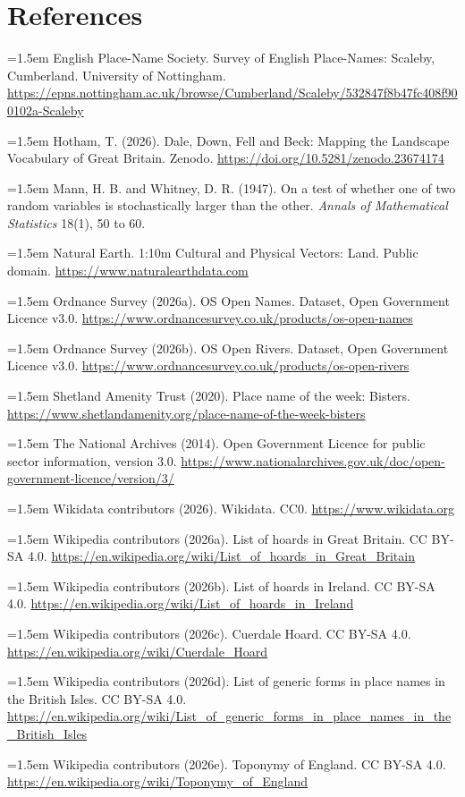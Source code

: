 \documentclass[11pt,a4paper]{article}
\begin{document}
\section*{References}
\small
\setlength{\parskip}{0.35em}
\hangindent=1.5em English Place-Name Society. Survey of English Place-Names: Scaleby, Cumberland. University of Nottingham. \url{https://epns.nottingham.ac.uk/browse/Cumberland/Scaleby/532847f8b47fc408f900102a-Scaleby}

\hangindent=1.5em Hotham, T. (2026). Dale, Down, Fell and Beck: Mapping the Landscape Vocabulary of Great Britain. Zenodo. \url{https://doi.org/10.5281/zenodo.23674174}

\hangindent=1.5em Mann, H. B. and Whitney, D. R. (1947). On a test of whether one of two random variables is stochastically larger than the other. \textit{Annals of Mathematical Statistics} 18(1), 50 to 60.

\hangindent=1.5em Natural Earth. 1:10m Cultural and Physical Vectors: Land. Public domain. \url{https://www.naturalearthdata.com}

\hangindent=1.5em Ordnance Survey (2026a). OS Open Names. Dataset, Open Government Licence v3.0. \url{https://www.ordnancesurvey.co.uk/products/os-open-names}

\hangindent=1.5em Ordnance Survey (2026b). OS Open Rivers. Dataset, Open Government Licence v3.0. \url{https://www.ordnancesurvey.co.uk/products/os-open-rivers}

\hangindent=1.5em Shetland Amenity Trust (2020). Place name of the week: Bisters. \url{https://www.shetlandamenity.org/place-name-of-the-week-bisters}

\hangindent=1.5em The National Archives (2014). Open Government Licence for public sector information, version 3.0. \url{https://www.nationalarchives.gov.uk/doc/open-government-licence/version/3/}

\hangindent=1.5em Wikidata contributors (2026). Wikidata. CC0. \url{https://www.wikidata.org}

\hangindent=1.5em Wikipedia contributors (2026a). List of hoards in Great Britain. CC BY-SA 4.0. \url{https://en.wikipedia.org/wiki/List_of_hoards_in_Great_Britain}

\hangindent=1.5em Wikipedia contributors (2026b). List of hoards in Ireland. CC BY-SA 4.0. \url{https://en.wikipedia.org/wiki/List_of_hoards_in_Ireland}

\hangindent=1.5em Wikipedia contributors (2026c). Cuerdale Hoard. CC BY-SA 4.0. \url{https://en.wikipedia.org/wiki/Cuerdale_Hoard}

\hangindent=1.5em Wikipedia contributors (2026d). List of generic forms in place names in the British Isles. CC BY-SA 4.0. \url{https://en.wikipedia.org/wiki/List_of_generic_forms_in_place_names_in_the_British_Isles}

\hangindent=1.5em Wikipedia contributors (2026e). Toponymy of England. CC BY-SA 4.0. \url{https://en.wikipedia.org/wiki/Toponymy_of_England}
\end{document}

